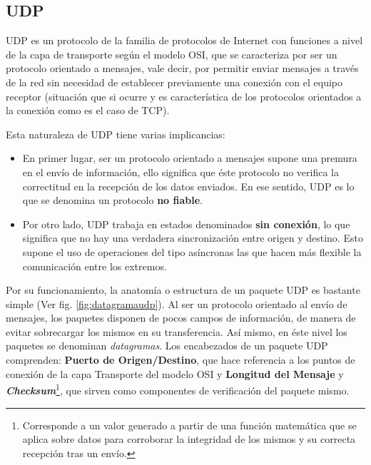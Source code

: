 \begin{intro}
\subsection*{UDP}
UDP \cite{rfc:768} es un protocolo de la familia de protocolos de Internet con funciones a nivel de la capa de transporte según el modelo OSI, que se caracteriza por ser un protocolo orientado a mensajes, vale decir, por permitir enviar mensajes a través de la red sin necesidad de establecer previamente una conexión con el equipo receptor (situación que si ocurre y es característica de los protocolos orientados a la conexión como es el caso de TCP).

Esta naturaleza de UDP tiene varias implicancias:
\begin{itemize}
\item En primer lugar, ser un protocolo orientado a mensajes supone una premura en el envío de información, ello significa que éste protocolo no verifica la correctitud en la recepción de los datos enviados. En ese sentido, UDP es lo que se denomina un protocolo \textbf{no fiable}.
\item Por otro lado, UDP trabaja en estados denominados \textbf{sin conexión}, lo que significa que no hay una verdadera sincronización entre origen y destino. Esto supone el uso de operaciones del tipo asíncronas las que hacen más flexible la comunicación entre los extremos.
\end{itemize}

Por su funcionamiento, la anatomía o estructura de un paquete UDP es bastante simple (Ver fig. \ref{fig:datagramaudp}). Al ser un protocolo orientado al envío de mensajes, los paquetes disponen de pocos campos de información, de manera de evitar sobrecargar los mismos en su transferencia. Así mismo, en éste nivel los paquetes se denominan \emph{datagramas}. Los encabezados de un paquete UDP comprenden: \textbf{Puerto de Origen/Destino}, que hace referencia a los puntos de conexión de la capa Transporte del modelo OSI y \textbf{Longitud del Mensaje} y \textbf{\emph{Checksum}}\footnote{Corresponde a un valor generado a partir de una función matemática que se aplica sobre datos para corroborar la integridad de los mismos y su correcta recepción tras un envío.}, que sirven como componentes de verificación del paquete mismo.


\end{intro}
